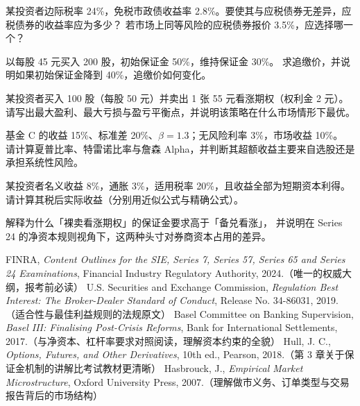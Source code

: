 \begin{exercises}
\item 某投资者边际税率 24\%，免税市政债收益率 2.8\%。要使其与应税债券无差异，应税债券的收益率应为多少？
若市场上同等风险的应税债券报价 3.5\%，应选择哪一个？

\item 以每股 45 元买入 200 股，初始保证金 50\%，维持保证金 30\%。
求追缴价，并说明如果初始保证金降到 40\%，追缴价如何变化。

\item 某投资者买入 100 股（每股 50 元）并卖出 1 张 55 元看涨期权（权利金 2 元）。
请写出最大盈利、最大亏损与盈亏平衡点，并说明该策略在什么市场情形下最优。

\item 基金 C 的收益 15\%、标准差 20\%、$\beta = 1.3$；无风险利率 3\%，市场收益 10\%。
请计算夏普比率、特雷诺比率与詹森 Alpha，并判断其超额收益主要来自选股还是承担系统性风险。

\item 某投资者名义收益 8\%，通胀 3\%，适用税率 20\%，且收益全部为短期资本利得。
请计算其税后实际收益（分别用近似公式与精确公式）。

\item 解释为什么「裸卖看涨期权」的保证金要求高于「备兑看涨」，
并说明在 Series 24 的净资本规则视角下，这两种头寸对券商资本占用的差异。
\end{exercises}

\begin{furtherreading}
 FINRA, \emph{Content Outlines for the SIE, Series 7, Series 57, Series 65 and Series 24 Examinations}, Financial Industry Regulatory Authority, 2024.（唯一的权威大纲，报考前必读）
 U.S. Securities and Exchange Commission, \emph{Regulation Best Interest: The Broker-Dealer Standard of Conduct}, Release No. 34-86031, 2019.（适合性与最佳利益规则的法规原文）
 Basel Committee on Banking Supervision, \emph{Basel III: Finalising Post-Crisis Reforms}, Bank for International Settlements, 2017.（与净资本、杠杆率要求对照阅读，理解资本约束的全貌）
 Hull, J. C., \emph{Options, Futures, and Other Derivatives}, 10th ed., Pearson, 2018.（第 3 章关于保证金机制的讲解比考试教材更清晰）
 Hasbrouck, J., \emph{Empirical Market Microstructure}, Oxford University Press, 2007.（理解做市义务、订单类型与交易报告背后的市场结构）
\end{furtherreading}
